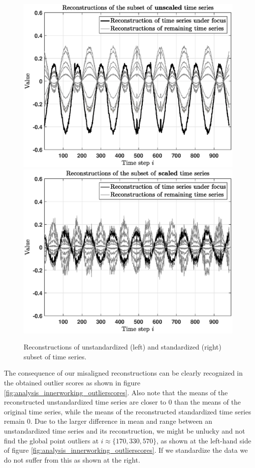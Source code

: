 \begin{figure}[h]
	\centering
	\includegraphics[scale=0.36]{analysis/Analysis_unscaled_reconstruction}
	\includegraphics[scale=0.36]{analysis/Analysis_scaled_reconstruction}
	\caption{Reconstructions of unstandardized (left) and standardized (right) subset of time series.}
	\label{fig:analysis_innerworking_reconstruction}
	\vspace{-0.15cm}
\end{figure}

\newpage
The consequence of our misaligned reconstructions can be clearly recognized in the obtained outlier scores as shown in figure \ref{fig:analysis_innerworking_outlierscores}. Also note that the means of the reconstructed unstandardized time series are closer to $0$ than the means of the original time series, while the means of the reconstructed standardized time series remain $0$. Due to the larger difference in mean and range between an unstandardized time series and its reconstruction, we might be unlucky and not find the global point outliers at $i \approx \{170, 330, 570\}$, as shown at the left-hand side of figure \ref{fig:analysis_innerworking_outlierscores}. If we standardize the data we do not suffer from this as shown at the right.

